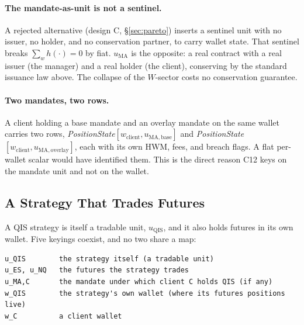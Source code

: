 \documentclass[11pt,a4paper]{article}
\begin{document}
\paragraph{The mandate-as-unit is not a sentinel.}
A rejected alternative (design C, \S\ref{sec:pareto}) inserts a sentinel unit with no
issuer, no holder, and no conservation partner, to carry wallet state. That sentinel breaks
$\sum_w h(\cdot)=0$ by fiat. $u_{\mathrm{MA}}$ is the opposite: a real contract with a real
issuer (the manager) and a real holder (the client), conserving by the standard issuance
law above. The collapse of the $W$-sector costs no conservation guarantee.

\paragraph{Two mandates, two rows.}
A client holding a base mandate and an overlay mandate on the same wallet carries two rows,
\emph{PositionState}$[w_{\mathrm{client}},u_{\mathrm{MA,base}}]$ and
\emph{PositionState}$[w_{\mathrm{client}},u_{\mathrm{MA,overlay}}]$, each with its own HWM,
fees, and breach flags. A flat per-wallet scalar would have identified them. This is the
direct reason C12 keys on the mandate unit and not on the wallet.

\subsection{A Strategy That Trades Futures}
\label{sec:qis}

A QIS strategy is itself a tradable unit, $u_{\mathrm{QIS}}$, and it also holds futures in
its own wallet. Five keyings coexist, and no two share a map:

\begin{lstlisting}[language={}]
u_QIS        the strategy itself (a tradable unit)
u_ES, u_NQ   the futures the strategy trades
u_MA,C       the mandate under which client C holds QIS (if any)
w_QIS        the strategy's own wallet (where its futures positions live)
w_C          a client wallet
\end{lstlisting}
\end{document}
